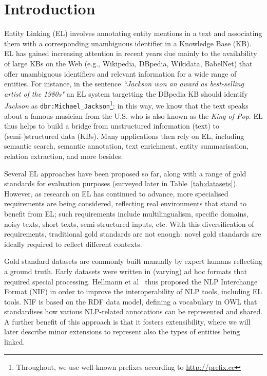 \documentclass[sigconf]{acmart}
\begin{document}
\section{Introduction}
Entity Linking (EL) involves annotating entity mentions in a text and associating them with a corresponding unambiguous identifier in a Knowledge Base (KB). EL has gained increasing attention in recent years due mainly to the availability of large KBs on the Web (e.g., Wikipedia, DBpedia, Wikidata, BabelNet) that offer unambiguous identifiers and relevant information for a wide range of entities. For instance, in the sentence \textit{``Jackson won an award as best-selling artist of the 1980s"} an EL system targetting the DBpedia KB should identify \textit{Jackson} as \texttt{dbr:Michael\_Jackson}\footnote{Throughout, we use well-known prefixes according to \url{http://prefix.cc}}; in this way, we know that the text speaks about a famous musician from the U.S. who is also known as the \textit{King of Pop}. EL thus helps to build a bridge from unstructured information (text) to (semi-)structured data (KBs).  Many applications then rely on EL, including semantic search, semantic annotation, text enrichment, entity summarisation, relation extraction, and more besides.

Several EL approaches have been proposed so far, along with a range of gold standards for evaluation purposes (surveyed later in Table~\ref{tab:datasets}). However, as research on EL has continued to advance, more specialised requirements are being considered, reflecting real environments that stand to benefit from EL; such requirements include multilingualism, specific domains, noisy texts, short texts, semi-structured inputs, etc. %
With this diversification of requirements, traditional gold standards are not enough: novel gold standards are ideally required to reflect different contexts.

Gold standard datasets are commonly built manually by expert humans reflecting a ground truth. Early datasets were written in (varying) ad hoc formats that required special processing. Hellmann et al~\cite{NIFpaper} thus proposed the NLP Interchange Format (NIF) in order to improve the interoperability of NLP tools, including EL tools. NIF is based on the RDF data model, defining a vocabulary in OWL that standardises how various NLP-related annotations can be represented and shared. A further benefit of this approach is that it fosters extensibility, where we will later describe minor extensions to represent also the types of entities being linked. %
\end{document}
